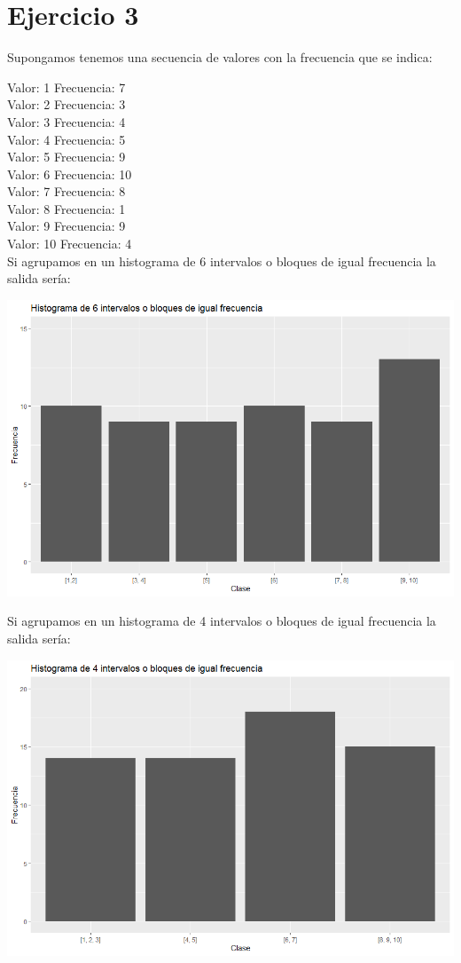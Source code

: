 \documentclass{uimppracticas}
\begin{document}
\section{Ejercicio 3}

Supongamos tenemos una secuencia de valores con la frecuencia que se indica:

Valor: 1 Frecuencia: 7\\
Valor: 2 Frecuencia: 3\\
Valor: 3 Frecuencia: 4\\
Valor: 4 Frecuencia: 5\\
Valor: 5 Frecuencia: 9\\
Valor: 6 Frecuencia: 10\\
Valor: 7 Frecuencia: 8\\
Valor: 8 Frecuencia: 1\\
Valor: 9 Frecuencia: 9\\
Valor: 10 Frecuencia: 4\\

Si agrupamos en un histograma de 6 intervalos o bloques de igual frecuencia la salida sería:

\begin{center}
	\includegraphics[scale=0.7]{code/exercise_three/hist_1}
\end{center}

Si agrupamos en un histograma de 4 intervalos o bloques de igual frecuencia la salida sería:

\begin{center}
	\includegraphics[scale=0.6]{code/exercise_three/hist_2}
\end{center}
\end{document}
